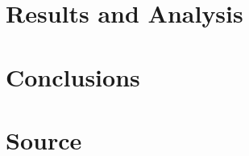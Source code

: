 \documentclass[11pt]{article}
\begin{document}
\section{Results and Analysis}
\label{sec:results_and_analysis}




\section{Conclusions}
\label{sec:conclusions}




\section{Source}
\label{sec:source}



\end{document}
